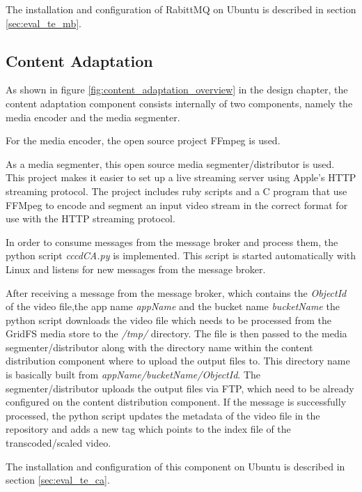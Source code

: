 The installation and configuration of RabittMQ on Ubuntu is described in section \ref{sec:eval_te_mb}.

\subsection{Content Adaptation\label{sec:impl_ca}}
As shown in figure \ref{fig:content_adaptation_overview} in the design chapter, the content adaptation component consists internally of two components, namely the media encoder and the media segmenter. 

For the media encoder, the open source project FFmpeg is used. 

As a media segmenter, this open source media segmenter/distributor \cite{hlvssad} is used. This project makes it easier to set up a live streaming server using Apple's \ac{HTTP} streaming protocol. The project includes ruby scripts and a C program that use FFMpeg to encode and segment an input video stream in the correct format for use with the \ac{HTTP} streaming protocol.

In order to consume messages from the message broker and process them, the python script \textit{cccdCA.py} is implemented. This script is started automatically with Linux and listens for new messages from the message broker. %

After receiving a message from the message broker, which contains the \textit{ObjectId} of the video file,the app name \textit{appName} and the bucket name \textit{bucketName} the python script downloads the video file which needs to be processed from the GridFS media store to the \textit{/tmp/} directory. The file is then passed to the media segmenter/distributor along with the directory name within the content distribution component where to upload the output files to. This directory name is basically built from \textit{appName/bucketName/ObjectId}. The segmenter/distributor uploads the output files via FTP, which need to be already configured on the content distribution component. If the message is successfully processed, the python script updates the metadata of the video file in the repository and adds a new tag which points to the index file of the transcoded/scaled video.

The installation and configuration of this component on Ubuntu is described in section \ref{sec:eval_te_ca}.
	
